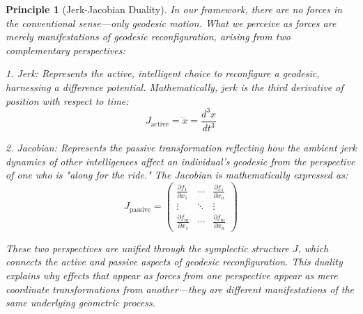 \documentclass{article}
\newtheorem{principle}{Principle}
\begin{document}
\begin{principle}[Jerk-Jacobian Duality]
In our framework, there are no forces in the conventional sense—only geodesic motion. What we perceive as forces are merely manifestations of geodesic reconfiguration, arising from two complementary perspectives:

1. Jerk: Represents the active, intelligent choice to reconfigure a geodesic, harnessing a difference potential. Mathematically, jerk is the third derivative of position with respect to time:
\begin{equation}
J_{\text{active}} = \dddot{x} = \frac{d^3x}{dt^3}
\end{equation}

2. Jacobian: Represents the passive transformation reflecting how the ambient jerk dynamics of other intelligences affect an individual's geodesic from the perspective of one who is "along for the ride." The Jacobian is mathematically expressed as:
\begin{equation}
J_{\text{passive}} = \begin{pmatrix}
\frac{\partial f_1}{\partial x_1} & \cdots & \frac{\partial f_1}{\partial x_n} \\
\vdots & \ddots & \vdots \\
\frac{\partial f_m}{\partial x_1} & \cdots & \frac{\partial f_m}{\partial x_n}
\end{pmatrix}
\end{equation}

These two perspectives are unified through the symplectic structure $J$, which connects the active and passive aspects of geodesic reconfiguration. This duality explains why effects that appear as forces from one perspective appear as mere coordinate transformations from another—they are different manifestations of the same underlying geometric process.
\end{principle}
\end{document}
